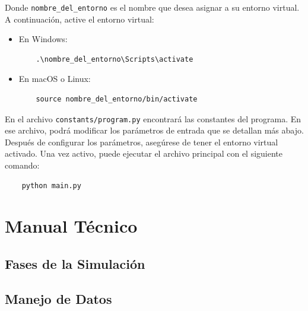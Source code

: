 \documentclass{article}
\begin{document}
Donde \texttt{nombre\_del\_entorno} es el nombre que desea asignar a su entorno virtual. 
A continuación, active el entorno virtual:

\begin{itemize}
  \item En Windows:
  \begin{verbatim}
    .\nombre_del_entorno\Scripts\activate
  \end{verbatim}
  \item En macOS o Linux:
  \begin{verbatim}
    source nombre_del_entorno/bin/activate
  \end{verbatim}
\end{itemize}

En el archivo \texttt{constants/program.py} encontrará las constantes del programa. 
En ese archivo, podrá modificar los parámetros de entrada que se detallan más abajo.\\

Después de configurar los parámetros, asegúrese de tener el entorno virtual activado. 
Una vez activo, puede ejecutar el archivo principal con el siguiente comando:

\begin{center}
  \begin{adjustbox}{minipage=\linewidth, center}
  \begin{verbatim}
    python main.py
  \end{verbatim}
  \end{adjustbox}
\end{center}


\section{Manual Técnico}\label{sec:man_t}


\subsection{Fases de la Simulación}


\subsection{Manejo de Datos}
\end{document}
